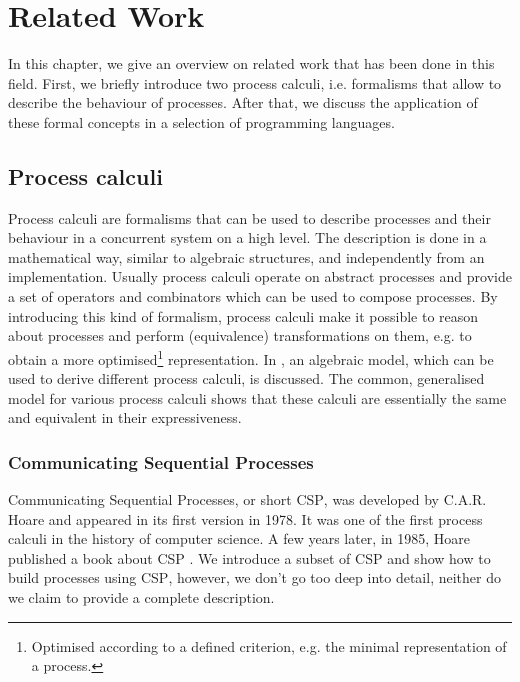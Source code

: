 \chapter{Related Work}
In this chapter, we give an overview on related work that has been done in this field. First, we briefly introduce two process calculi, i.e. formalisms that allow to describe the behaviour of processes. After that, we discuss the application of these formal concepts in a selection of programming languages.

\section{Process calculi}
\label{chp:process_calculi}
Process calculi are formalisms that can be used to describe processes and their behaviour in a concurrent system on a high level. The description is done in a mathematical way, similar to algebraic structures, and independently from an implementation. Usually process calculi operate on abstract processes and provide a set of operators and combinators which can be used to compose processes. By introducing this kind of formalism, process calculi make it possible to reason about processes and perform (equivalence) transformations on them, e.g. to obtain a more optimised\footnote{Optimised according to a defined criterion, e.g. the minimal representation of a process.} representation. In \cite{Hoare:2012:LPU:2368298.2368301}, an algebraic model, which can be used to derive different process calculi, is discussed. The common, generalised model for various process calculi shows that these calculi are essentially the same and equivalent in their expressiveness.


\subsection{Communicating Sequential Processes}
Communicating Sequential Processes, or short \textsc{CSP}, was developed by C.A.R. Hoare and appeared in its first version in 1978. It was one of the first process calculi in the history of computer science. A few years later, in 1985, Hoare published a book about \textsc{CSP} \cite{Hoare:1985:CSP:3921}. We introduce a subset of \textsc{CSP} and show how to build processes using \textsc{CSP}, however, we don't go too deep into detail, neither do we claim to provide a complete description.

